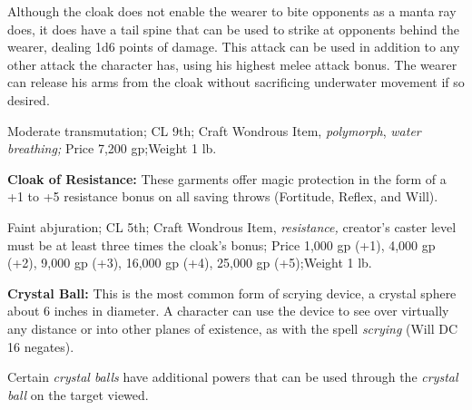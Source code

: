 Although the cloak does not enable the wearer to bite opponents as a manta ray 
does, it does have a tail spine that can be used to strike at opponents behind 
the wearer, dealing 1d6 points of damage. This attack can be used in addition to 
any other attack the character has, using his highest melee attack bonus. The wearer 
can release his arms from the cloak without sacrificing underwater movement if 
so desired.

Moderate transmutation; CL 9th; Craft Wondrous Item, \textit{polymorph}, \textit{water 
breathing; }Price 7,200 gp;Weight 1 lb.

\textbf{Cloak of Resistance:} These garments offer magic protection in the form 
of a +1 to +5 resistance bonus on all saving throws (Fortitude, Reflex, and Will).

Faint abjuration; CL 5th; Craft Wondrous Item, \textit{resistance, }creator's caster 
level must be at least three times the cloak's bonus; Price 1,000 gp (+1), 4,000 
gp (+2), 9,000 gp (+3), 16,000 gp (+4), 25,000 gp (+5);Weight 1 lb.

\textbf{Crystal Ball:} This is the most common form of scrying device, a crystal 
sphere about 6 inches in diameter. A character can use the device to see over virtually 
any distance or into other planes of existence, as with the spell \textit{scrying 
}(Will DC 16 negates).

Certain \textit{crystal balls }have additional powers that can be used through 
the \textit{crystal ball }on the target viewed.

